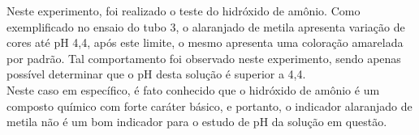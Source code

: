 \begin{figure}[h]
            \label{fig:experimento13}
        \end{figure}
    	
    	\indent Neste experimento, foi realizado o teste do hidróxido de amônio. Como exemplificado no ensaio do tubo 3, o alaranjado de metila apresenta variação de cores até pH 4,4, após este limite, o mesmo apresenta uma coloração amarelada por padrão. Tal comportamento foi observado neste experimento, sendo apenas possível determinar que o pH desta solução é superior a 4,4. \\
    	
    	\indent Neste caso em específico, é fato conhecido que o hidróxido de amônio é um composto químico com forte caráter básico, e portanto, o indicador alaranjado de metila não é um bom indicador para o estudo de pH da solução em questão.

